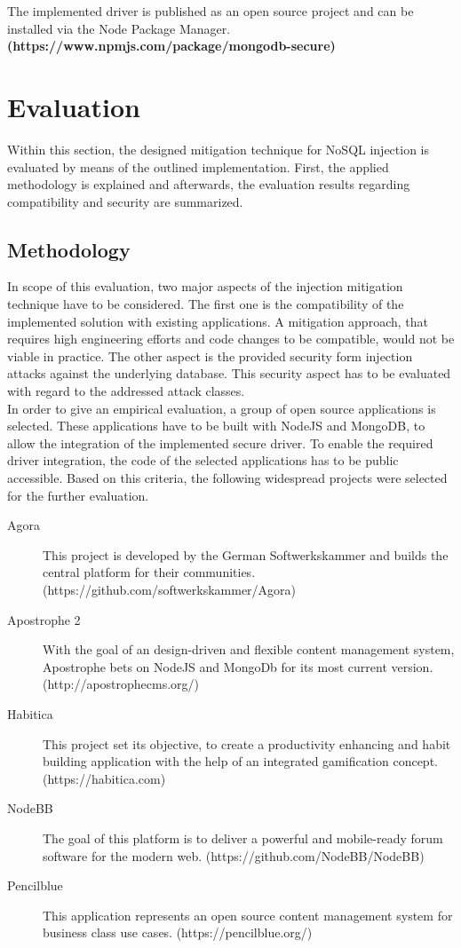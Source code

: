 The implemented driver is published as an open source project and can be installed via the Node Package Manager. \textbf{(https://www.npmjs.com/package/mongodb-secure)}


\section{Evaluation}
\label{sec:evaluation}
Within this section, the designed mitigation technique for NoSQL injection is evaluated by means of the outlined implementation. First, the applied methodology is explained and afterwards, the evaluation results regarding compatibility and security are summarized.

\subsection{Methodology}
In scope of this evaluation, two major aspects of the injection mitigation technique have to be considered. The first one is the compatibility of the implemented solution with existing applications. A mitigation approach, that requires high engineering efforts and code changes to be compatible, would not be viable in practice. The other aspect is the provided security form injection attacks against the underlying database. This security aspect has to be evaluated with regard to the addressed attack classes. \\

In order to give an empirical evaluation, a group of open source applications is selected. These applications have to be built with NodeJS and MongoDB, to allow the integration of the implemented secure driver. To enable the required driver integration, the code of the selected applications has to be public accessible. Based on this criteria, the following widespread projects were selected for the further evaluation.

\begin{description}
\item [Agora] This project is developed by the German Softwerkskammer and builds the central platform for their communities. (https://github.com/softwerkskammer/Agora)
\item [Apostrophe 2] With the goal of an design-driven and flexible content management system, Apostrophe bets on NodeJS and MongoDb for its most current version. (http://apostrophecms.org/)
\item [Habitica] This project set its objective, to create a productivity enhancing and habit building application with the help of an integrated gamification concept. (https://habitica.com)
\item [NodeBB] The goal of this platform is to deliver a powerful and mobile-ready forum software for the modern web. (https://github.com/NodeBB/NodeBB)
\item [Pencilblue] This application represents an open source content management system for business class use cases. (https://pencilblue.org/)
\end{description}

